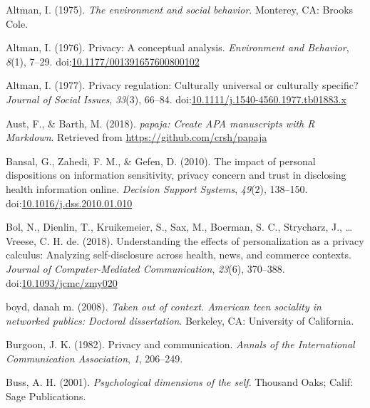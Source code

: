 \documentclass[man,floatsintext]{apa6}
\begin{document}
\begingroup
\setlength{\parindent}{-0.5in}
\setlength{\leftskip}{0.5in}

\hypertarget{refs}{}
\leavevmode\hypertarget{ref-Altman.1975}{}%
Altman, I. (1975). \emph{The environment and social behavior}. Monterey, CA: Brooks Cole.

\leavevmode\hypertarget{ref-Altman.1976}{}%
Altman, I. (1976). Privacy: A conceptual analysis. \emph{Environment and Behavior}, \emph{8}(1), 7--29. doi:\href{https://doi.org/10.1177/001391657600800102}{10.1177/001391657600800102}

\leavevmode\hypertarget{ref-Altman.1977}{}%
Altman, I. (1977). Privacy regulation: Culturally universal or culturally specific? \emph{Journal of Social Issues}, \emph{33}(3), 66--84. doi:\href{https://doi.org/10.1111/j.1540-4560.1977.tb01883.x}{10.1111/j.1540-4560.1977.tb01883.x}

\leavevmode\hypertarget{ref-R-papaja}{}%
Aust, F., \& Barth, M. (2018). \emph{papaja: Create APA manuscripts with R Markdown}. Retrieved from \url{https://github.com/crsh/papaja}

\leavevmode\hypertarget{ref-Bansal.2010}{}%
Bansal, G., Zahedi, F. M., \& Gefen, D. (2010). The impact of personal dispositions on information sensitivity, privacy concern and trust in disclosing health information online. \emph{Decision Support Systems}, \emph{49}(2), 138--150. doi:\href{https://doi.org/10.1016/j.dss.2010.01.010}{10.1016/j.dss.2010.01.010}

\leavevmode\hypertarget{ref-Bol.2018}{}%
Bol, N., Dienlin, T., Kruikemeier, S., Sax, M., Boerman, S. C., Strycharz, J., \ldots{} Vreese, C. H. de. (2018). Understanding the effects of personalization as a privacy calculus: Analyzing self-disclosure across health, news, and commerce contexts. \emph{Journal of Computer-Mediated Communication}, \emph{23}(6), 370--388. doi:\href{https://doi.org/10.1093/jcmc/zmy020}{10.1093/jcmc/zmy020}

\leavevmode\hypertarget{ref-boyd.2008c}{}%
boyd, danah m. (2008). \emph{Taken out of context. American teen sociality in networked publics: Doctoral dissertation}. Berkeley, CA: University of California.

\leavevmode\hypertarget{ref-Burgoon.1982}{}%
Burgoon, J. K. (1982). Privacy and communication. \emph{Annals of the International Communication Association}, \emph{1}, 206--249.

\leavevmode\hypertarget{ref-Buss.2001}{}%
Buss, A. H. (2001). \emph{Psychological dimensions of the self}. Thousand Oaks; Calif: Sage Publications.
\end{document}
